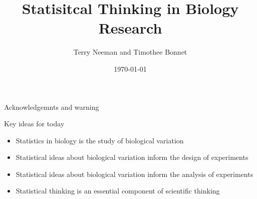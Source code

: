 \documentclass{beamer}
\title{Statisitcal Thinking in Biology Research}
\author{Terry Neeman and Timothee Bonnet}
\date{\today}
\begin{document}



\begin{frame}{}
\maketitle

\end{frame}

\begin{frame}{Acknowledgemnts and warning}

\end{frame}

\begin{frame}{Key ideas for today}

\begin{itemize}[<+->]
 \item Statistics in biology is the study of biological variation
 \item Statistical ideas about biological variation inform the design of experiments
 \item Statistical ideas about biological variation inform the analysis of experiments
 \item Statistical thinking is an essential component of scientific thinking
\end{itemize}

\end{frame}
\end{document}
